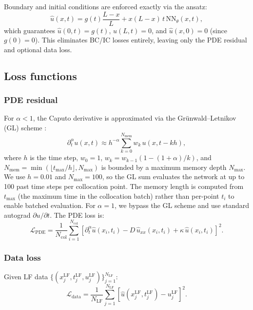 \documentclass[preprint,12pt]{elsarticle}
\newcommand{\Lcal}{\mathcal{L}}
\newcommand{\Ncol}{N_{\mathrm{col}}}
\newcommand{\NLF}{N_{\mathrm{LF}}}
\begin{document}
Boundary and initial conditions are enforced exactly via the ansatz:
\begin{equation}
\label{eq:hard_bc}
\hat{u}(x, t) = g(t)\frac{L-x}{L} + x(L-x)\,t\,\mathrm{NN}_\theta(x, t),
\end{equation}
which guarantees $\hat{u}(0,t) = g(t)$, $\hat{u}(L,t) = 0$, and $\hat{u}(x,0) = 0$ (since $g(0) = 0$). This eliminates BC/IC losses entirely, leaving only the PDE residual and optional data loss.

\subsection{Loss functions}

\subsubsection{PDE residual}

For $\alpha < 1$, the Caputo derivative is approximated via the Gr\"unwald--Letnikov (GL) scheme \cite{meerschaert2004finite,podlubny1999fractional,diethelm2002numerical}:
\begin{equation}
\label{eq:gl}
\partial_t^\alpha u(x, t) \approx h^{-\alpha} \sum_{k=0}^{N_{\mathrm{mem}}} w_k\, u(x, t - kh),
\end{equation}
where $h$ is the time step, $w_0 = 1$, $w_k = w_{k-1}(1 - (1+\alpha)/k)$, and $N_{\mathrm{mem}} = \min(\lfloor t_{\max}/h \rfloor, N_{\mathrm{max}})$ is bounded by a maximum memory depth $N_{\mathrm{max}}$. We use $h = 0.01$ and $N_{\mathrm{max}} = 100$, so the GL sum evaluates the network at up to 100 past time steps per collocation point. The memory length is computed from $t_{\max}$ (the maximum time in the collocation batch) rather than per-point $t_i$ to enable batched evaluation. For $\alpha = 1$, we bypass the GL scheme and use standard autograd $\partial u / \partial t$. The PDE loss is:
\begin{equation}
\Lcal_{\mathrm{PDE}} = \frac{1}{\Ncol} \sum_{i=1}^{\Ncol} \left[\partial_t^\alpha \hat{u}(x_i, t_i) - D\, \hat{u}_{xx}(x_i, t_i) + \kappa\, \hat{u}(x_i, t_i)\right]^2.
\end{equation}

\subsubsection{Data loss}

Given LF data $\{(x_j^{\mathrm{LF}}, t_j^{\mathrm{LF}}, u_j^{\mathrm{LF}})\}_{j=1}^{\NLF}$:
\begin{equation}
\Lcal_{\mathrm{data}} = \frac{1}{\NLF} \sum_{j=1}^{\NLF} \left[\hat{u}(x_j^{\mathrm{LF}}, t_j^{\mathrm{LF}}) - u_j^{\mathrm{LF}}\right]^2.
\end{equation}
\end{document}

